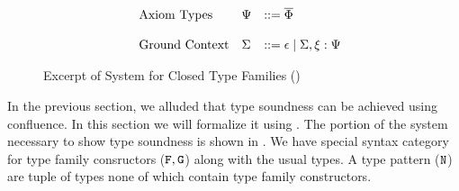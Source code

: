 \documentclass[format=acmsmall,manuscript,review,screen,nonacm,margin=1in,11pt]{acmart}
\begin{document}
\begin{figure}[ht]
\[\begin{array}{l l l l l}
      &\text{Axiom Types}     &\Psi     &\mathrel{{:}{:}{=}} \overline{\Phi}\\
      \\
      &\text{Ground Context} &\Sigma   &\mathrel{{:}{:}{=}} \epsilon \mathrel{\mid} \Sigma,\xi:\Psi
    \end{array}
  \]
  \caption[Excerpt \CLTF{}]{Excerpt of System for Closed Type Families (\CLTF)}
  \label{fig:syntax-tf-closed}
\end{figure}
In the previous section, we alluded that type soundness can be achieved using
confluence. In this section we will formalize it using \CLTF. The portion of the system necessary
to show type soundness is shown in . We have special syntax category for
type family consructors ($\texttt{F},\texttt{G}$) along with the usual types.
A type pattern ($\texttt{N}$) are tuple of types none of which contain type family constructors.
\end{document}
